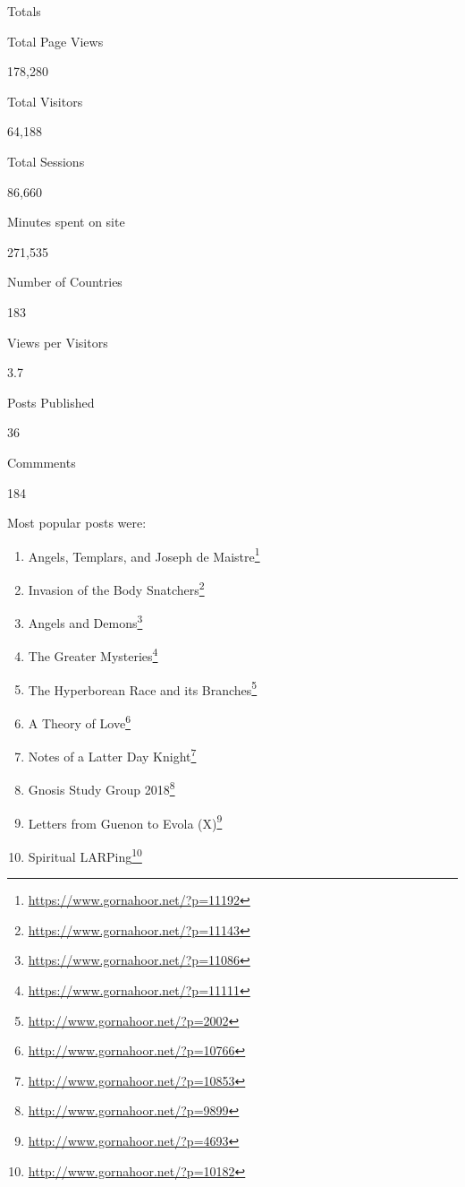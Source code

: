Totals

Total Page Views

178,280

Total Visitors

64,188

Total Sessions

86,660

Minutes spent on site

271,535

Number of Countries

183

Views per Visitors

3.7

Posts Published

36

Commments

184

Most popular posts were:

\begin{enumerate}


\item Angels, Templars, and Joseph de Maistre\footnote{\url{https://www.gornahoor.net/?p=11192}}

\item Invasion of the Body Snatchers\footnote{\url{https://www.gornahoor.net/?p=11143}}

\item Angels and Demons\footnote{\url{https://www.gornahoor.net/?p=11086}}

\item The Greater Mysteries\footnote{\url{https://www.gornahoor.net/?p=11111}}

\item The Hyperborean Race and its Branches\footnote{\url{http://www.gornahoor.net/?p=2002}}

\item A Theory of Love\footnote{\url{http://www.gornahoor.net/?p=10766}}

\item Notes of a Latter Day Knight\footnote{\url{http://www.gornahoor.net/?p=10853}}

\item Gnosis Study Group 2018\footnote{\url{http://www.gornahoor.net/?p=9899}}

\item Letters from Guenon to Evola (X)\footnote{\url{http://www.gornahoor.net/?p=4693}}

\item Spiritual LARPing\footnote{\url{http://www.gornahoor.net/?p=10182}}
\end{enumerate}



